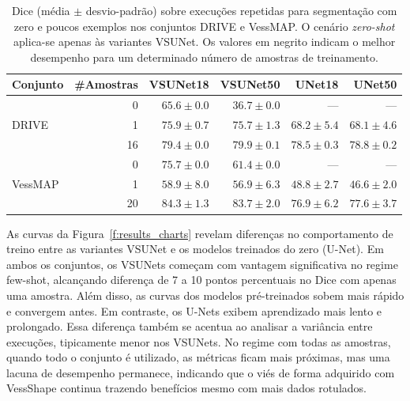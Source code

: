 \documentclass[%
reprint,
nofootinbib,
 amsmath,amssymb,
aps,
floatfix,
superscriptaddress,
showkeys,
longbibliography
]{revtex4-1}
\begin{document}
\begin{table}[t]
    \caption{Dice (média $\pm$ desvio-padrão) sobre execuções repetidas para segmentação com zero e poucos exemplos nos conjuntos DRIVE e VessMAP. O cenário \textit{zero-shot} aplica-se apenas às variantes VSUNet. Os valores em negrito indicam o melhor desempenho para um determinado número de amostras de treinamento.}
    \label{tab:combined_fewshot_dice_models}
    \centering
    \begingroup
    \small
    \setlength{\tabcolsep}{6pt}
    \renewcommand{\arraystretch}{1.15}
    \begin{tabular}{l r r r r r}
        \hline
        \textbf{Conjunto} & \textbf{\#Amostras} & \textbf{VSUNet18} & \textbf{VSUNet50} & \textbf{UNet18} & \textbf{UNet50} \\
        \hline
        \multirow{3}{*}{DRIVE}
            & 0  & $\mathbf{65.6} \pm 0.0$ & $36.7 \pm 0.0$ & --- & --- \\
            & 1  & $\mathbf{75.9} \pm 0.7$ & $75.7 \pm 1.3$ & $68.2 \pm 5.4$ & $68.1 \pm 4.6$ \\
            & 16 & $79.4 \pm 0.0$ & $\mathbf{79.9} \pm 0.1$ & $78.5 \pm 0.3$ & $78.8 \pm 0.2$ \\
        \hline
        \multirow{3}{*}{VessMAP}
            & 0  & $\mathbf{75.7} \pm 0.0$ & $61.4 \pm 0.0$ & --- & --- \\
            & 1  & $\mathbf{58.9} \pm 8.0$ & $56.9 \pm 6.3$ & $48.8 \pm 2.7$ & $46.6 \pm 2.0$ \\
            & 20 & $\mathbf{84.3} \pm 1.3$ & $83.7 \pm 2.0$ & $76.9 \pm 6.2$ & $77.6 \pm 3.7$ \\
        \hline
    \end{tabular}
    \endgroup 
\end{table}

As curvas da Figura~\ref{f:results_charts} revelam diferenças no comportamento de treino entre as variantes VSUNet e os modelos treinados do zero (U-Net). Em ambos os conjuntos, os VSUNets começam com vantagem significativa no regime few-shot, alcançando diferença de 7 a 10 pontos percentuais no Dice com apenas uma amostra. Além disso, as curvas dos modelos pré-treinados sobem mais rápido e convergem antes. Em contraste, os U-Nets exibem aprendizado mais lento e prolongado. Essa diferença também se acentua ao analisar a variância entre execuções, tipicamente menor nos VSUNets. No regime com todas as amostras, quando todo o conjunto é utilizado, as métricas ficam mais próximas, mas uma lacuna de desempenho permanece, indicando que o viés de forma adquirido com VessShape continua trazendo benefícios mesmo com mais dados rotulados.
\end{document}
